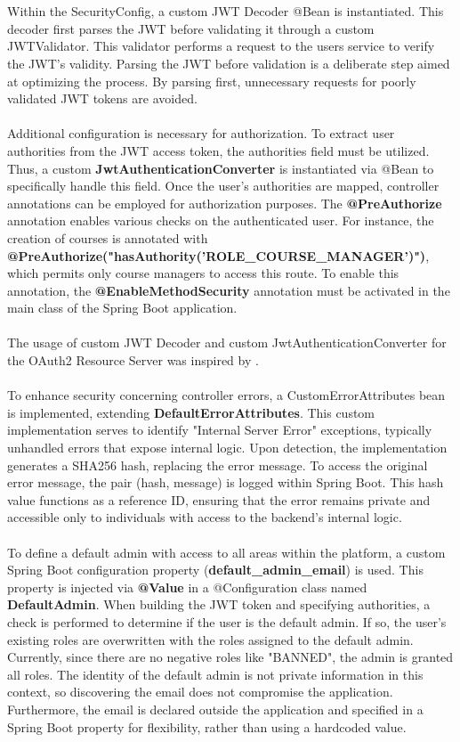 \\\\
\noindent Within the SecurityConfig, a custom JWT Decoder @Bean is instantiated. This decoder first parses the JWT before validating it through a custom JWTValidator. This validator performs a request to the users service to verify the JWT's validity. Parsing the JWT before validation is a deliberate step aimed at optimizing the process. By parsing first, unnecessary requests for poorly validated JWT tokens are avoided.
\\\\
\noindent Additional configuration is necessary for authorization. To extract user authorities from the JWT access token, the authorities field must be utilized. Thus, a custom \textbf{JwtAuthenticationConverter} is instantiated via @Bean to specifically handle this field. Once the user's authorities are mapped, controller annotations can be employed for authorization purposes. The \textbf{@PreAuthorize} annotation enables various checks on the authenticated user. For instance, the creation of courses is annotated with \textbf{@PreAuthorize("hasAuthority('ROLE\_COURSE\_MANAGER')")}, which permits only course managers to access this route. To enable this annotation, the \textbf{@EnableMethodSecurity} annotation must be activated in the main class of the Spring Boot application.
\\\\
\noindent The usage of custom JWT Decoder and custom JwtAuthenticationConverter for the OAuth2 Resource Server was inspired by \cite{spring-security-resource-server}.
\\\\
\noindent To enhance security concerning controller errors, a CustomErrorAttributes bean is implemented, extending \textbf{DefaultErrorAttributes}. This custom implementation serves to identify "Internal Server Error" exceptions, typically unhandled errors that expose internal logic. Upon detection, the implementation generates a SHA256 hash, replacing the error message. To access the original error message, the pair (hash, message) is logged within Spring Boot. This hash value functions as a reference ID, ensuring that the error remains private and accessible only to individuals with access to the backend's internal logic.
\\\\
\noindent To define a default admin with access to all areas within the platform, a custom Spring Boot configuration property (\textbf{default\_admin\_email}) is used. This property is injected via \textbf{@Value} in a @Configuration class named \textbf{DefaultAdmin}. When building the JWT token and specifying authorities, a check is performed to determine if the user is the default admin. If so, the user's existing roles are overwritten with the roles assigned to the default admin. Currently, since there are no negative roles like "BANNED", the admin is granted all roles. The identity of the default admin is not private information in this context, so discovering the email does not compromise the application. Furthermore, the email is declared outside the application and specified in a Spring Boot property for flexibility, rather than using a hardcoded value.

